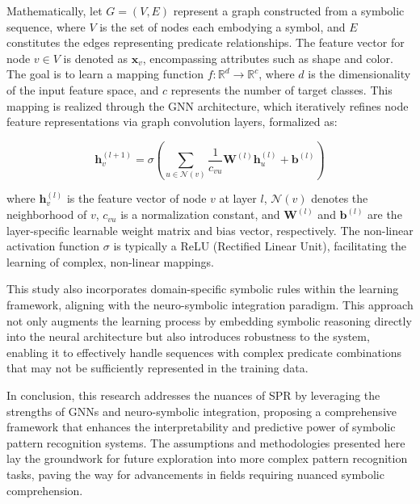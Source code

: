 \documentclass{article}
\begin{document}
Mathematically, let \( G = (V, E) \) represent a graph constructed from a symbolic sequence, where \( V \) is the set of nodes each embodying a symbol, and \( E \) constitutes the edges representing predicate relationships. The feature vector for node \( v \in V \) is denoted as \( \mathbf{x}_v \), encompassing attributes such as shape and color. The goal is to learn a mapping function \( f: \mathbb{R}^d \rightarrow \mathbb{R}^c \), where \( d \) is the dimensionality of the input feature space, and \( c \) represents the number of target classes. This mapping is realized through the GNN architecture, which iteratively refines node feature representations via graph convolution layers, formalized as:

\[
\mathbf{h}_v^{(l+1)} = \sigma \left(\sum_{u \in \mathcal{N}(v)} \frac{1}{c_{vu}} \mathbf{W}^{(l)} \mathbf{h}_u^{(l)} + \mathbf{b}^{(l)} \right)
\]

where \( \mathbf{h}_v^{(l)} \) is the feature vector of node \( v \) at layer \( l \), \( \mathcal{N}(v) \) denotes the neighborhood of \( v \), \( c_{vu} \) is a normalization constant, and \( \mathbf{W}^{(l)} \) and \( \mathbf{b}^{(l)} \) are the layer-specific learnable weight matrix and bias vector, respectively. The non-linear activation function \( \sigma \) is typically a ReLU (Rectified Linear Unit), facilitating the learning of complex, non-linear mappings.

This study also incorporates domain-specific symbolic rules within the learning framework, aligning with the neuro-symbolic integration paradigm. This approach not only augments the learning process by embedding symbolic reasoning directly into the neural architecture but also introduces robustness to the system, enabling it to effectively handle sequences with complex predicate combinations that may not be sufficiently represented in the training data.

In conclusion, this research addresses the nuances of SPR by leveraging the strengths of GNNs and neuro-symbolic integration, proposing a comprehensive framework that enhances the interpretability and predictive power of symbolic pattern recognition systems. The assumptions and methodologies presented here lay the groundwork for future exploration into more complex pattern recognition tasks, paving the way for advancements in fields requiring nuanced symbolic comprehension.
\end{document}
